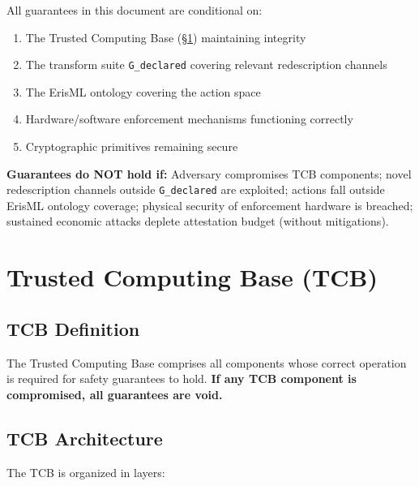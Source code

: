 \documentclass[11pt,letterpaper]{article}
\theoremstyle{definition}
\theoremstyle{remark}
\begin{document}
All guarantees in this document are conditional on:
\begin{enumerate}
\item The Trusted Computing Base (\S\ref{sec:tcb}) maintaining integrity
\item The transform suite \texttt{G\_declared} covering relevant redescription channels
\item The ErisML ontology covering the action space
\item Hardware/software enforcement mechanisms functioning correctly
\item Cryptographic primitives remaining secure
\end{enumerate}

\noindent\textbf{Guarantees do NOT hold if:} Adversary compromises TCB components; novel redescription channels outside \texttt{G\_declared} are exploited; actions fall outside ErisML ontology coverage; physical security of enforcement hardware is breached; sustained economic attacks deplete attestation budget (without mitigations).



\section{Trusted Computing Base (TCB)}
\label{sec:tcb}

\subsection{TCB Definition}

The Trusted Computing Base comprises all components whose correct operation is required for safety guarantees to hold. \textbf{If any TCB component is compromised, all guarantees are void.}

\subsection{TCB Architecture}

The TCB is organized in layers:
\end{document}
